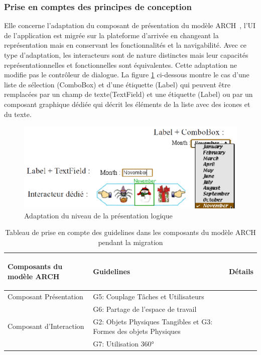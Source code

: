 \subsubsection{ Prise en comptes des principes de conception }
Elle concerne l'adaptation du composant de présentation du modèle ARCH~\cite{Pfaff1985}, l'UI de l'application est migrée sur la plateforme d'arrivée en changeant la représentation mais en conservant les fonctionnalités et la navigabilité. Avec ce type d'adaptation, les interacteurs sont de nature distinctes mais leur capacités représentationnelles et fonctionnelles sont équivalentes. Cette adaptation ne modifie pas le contrôleur de dialogue. La figure \ref{fig:chap2:9} ci-dessous montre le cas d'une liste de sélection (ComboBox) et d'une étiquette (Label) qui peuvent être remplacées par un champ de texte(TextField) et une étiquette (Label) ou par un composant graphique dédiée qui décrit les éléments de la liste avec des icones et du texte. 
\begin{figure}[ht]
\begin{center}
\label{fig:chap2:9}
\caption{Adaptation du niveau de la présentation logique}
\includegraphics[scale=1]{chap3/img-4} 
\end{center}
\end{figure}


\begin{table}[h²]
\begin{tabularx}{15cm}{|p{2.5cm}|p{7cm}|X|}
 \hline \begin{center}
 \textbf{{\small Composants du modèle ARCH}}
 \end{center}& \begin{center}
 \textbf{{\small  Guidelines}}
 \end{center} & \begin{center}
 \textbf{{\small Détails} }
 \end{center} \\ 
\hline {\small  Composant Présentation}& {\small G5: Couplage Tâches et Utilisateurs} &  \\ 
 \cline{2-3} & {\small G6: Partage de l'espace de travail}  &  \\ 
\hline {\small  Composant d'Interaction}& {\small G2: Objets Physiques Tangibles et G3: Formes des objets Physiques} &  \\ 
 \cline{2-3} & {\small G7: Utilisation 360°} &  \\ 
\hline 
\end{tabularx}
\caption{Tableau de prise en compte des guidelines dans les composants du modèle ARCH pendant la migration}
\label{tab:chap2:}
\end{table}

